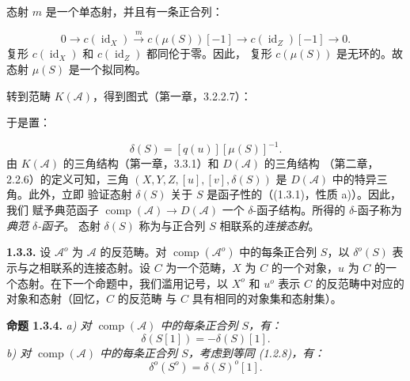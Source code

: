 \clearpage
{}%
\begingroup\small\setlength{\parskip}{0pt}\setlength{\emergencystretch}{1.5em}
\setlength{\abovedisplayskip}{4pt plus 2pt minus 2pt}%
\setlength{\belowdisplayskip}{4pt plus 2pt minus 2pt}%

态射 $m$ 是一个单态射，并且有一条正合列：

\begin{equation}
0\longrightarrow c(\operatorname{id}_X)
\xrightarrow{m}c(\mu(S))[-1]
\longrightarrow c(\operatorname{id}_Z)[-1]
\longrightarrow0.
\tag{1.3.2.3}
\end{equation}
复形 $c(\operatorname{id}_X)$ 和 $c(\operatorname{id}_Z)$ 都同伦于零。因此，
复形 $c(\mu(S))$ 是无环的。故态射 $\mu(S)$ 是一个拟同构。

转到范畴 $K(\mathcal A)$，得到图式（第一章，3.2.2.7）：
\begin{center}
\end{center}
于是置：

\begin{equation}
\delta(S)=[q(u)][\mu(S)]^{-1}.
\tag{1.3.2.4}
\end{equation}
由 $K(\mathcal A)$ 的三角结构（第一章，3.3.1）和 $D(\mathcal A)$ 的三角结构
（第二章，2.2.6）的定义可知，三角
$(X,Y,Z,[u],[v],\delta(S))$ 是 $D(\mathcal A)$ 中的特异三角。此外，立即
验证态射 $\delta(S)$ 关于 $S$ 是函子性的（(1.3.1)，性质 a)）。因此，我们
赋予典范函子
$\operatorname{comp}(\mathcal A)\longrightarrow D(\mathcal A)$ 一个
$\delta$-函子结构。所得的 $\delta$-函子称为\emph{典范 $\delta$-函子}。
态射 $\delta(S)$ 称为与正合列 $S$ 相联系的\emph{连接态射}。

\medskip\noindent\textbf{1.3.3.}\quad
设 $\mathcal A^o$ 为 $\mathcal A$ 的反范畴。对
$\operatorname{comp}(\mathcal A^o)$ 中的每条正合列 $S$，以
$\delta^o(S)$ 表示与之相联系的连接态射。设 $C$ 为一个范畴，$X$ 为 $C$
的一个对象，$u$ 为 $C$ 的一个态射。在下一个命题中，我们滥用记号，以
$X^o$ 和 $u^o$ 表示 $C$ 的反范畴中对应的对象和态射（回忆，$C$ 的反范畴
与 $C$ 具有相同的对象集和态射集）。

\medskip\noindent\textbf{命题 1.3.4.}\quad
\textit{a) 对 $\operatorname{comp}(\mathcal A)$ 中的每条正合列 $S$，有：}
\[
\delta(S[1])=-\delta(S)[1].
\]
\noindent\textit{b) 对 $\operatorname{comp}(\mathcal A)$ 中的每条正合列
$S$，考虑到等同 (1.2.8)，有：}
\[
\delta^o(S^o)=\delta(S)^o[1].
\]
\endgroup
